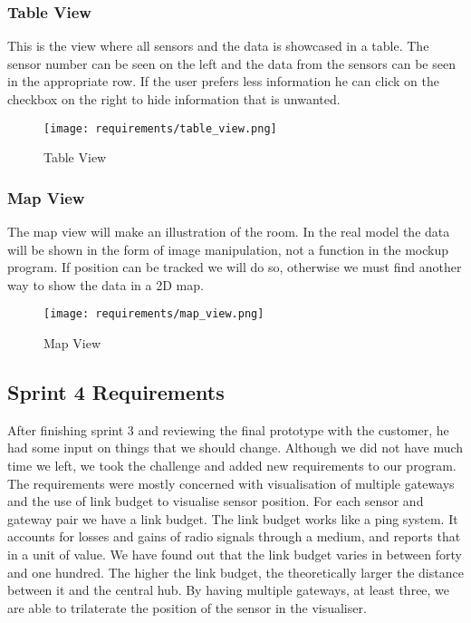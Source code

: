 \documentclass[../document]{subfiles}
\begin{document}
\newpage

\subsubsection{Table View}
This is the view where all sensors and the data is showcased in a table. The sensor number can be seen on the left and the data from the sensors can be seen in the appropriate row. If the user prefers less information he can click on the checkbox on the right to hide information that is unwanted.

\begin{figure}[H]
\centering
\texttt{[image: requirements/table\_view.png]}
\caption{Table View}
\end{figure}

\newpage

\subsubsection{Map View}
The map view will make an illustration of the room. In the real model the data will be shown in the form of image manipulation, not a function in the mockup program. If position can be tracked we will do so, otherwise we must find another way to show the data in a 2D map.

\begin{figure}[H]
\centering
\texttt{[image: requirements/map\_view.png]}
\caption{Map View}
\end{figure}

\newpage
\subsection{Sprint 4 Requirements}
\label{requirements_sprint_4}
After finishing sprint 3 and reviewing the final prototype with the customer, he had some input on things that we should change. Although we did not have much time we left, we took the challenge and added new requirements to our program. The requirements were mostly concerned with visualisation of multiple gateways and the use of link budget to visualise sensor position. For each sensor and gateway pair we have a link budget. The link budget works like a ping system. It accounts for losses and gains of radio signals through a medium, and reports that in a unit of value. We have found out that the link budget varies in between forty and one hundred. The higher the link budget, the theoretically larger the distance between it and the central hub. By having multiple gateways, at least three, we are able to trilaterate the position of the sensor in the visualiser.
\end{document}

